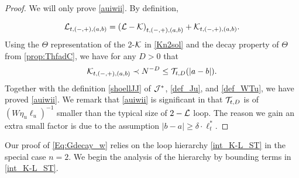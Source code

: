 \documentclass[10pt,reqno]{article}
\theoremstyle{plain} %
\theoremstyle{remark}
\numberwithin{equation}{section}
\begin{document}
\begin{proof} We will only prove \eqref{auiwii}. By definition, 

\[
{\cal L}_{t, (-,+),(a, b)} = \left({\cal L} - \cal K\right)_{t, (-,+),(a, b)} + {\cal K}_{t, (-,+),(a, b)}.
\]
Using the $\Theta$ representation of the 2-\(\cal K\) in \eqref{Kn2sol} and the decay property of \(\Theta\) from \eqref{prop:ThfadC}, we have  for any \(D > 0\) that 
\[
{\cal K}_{t, (-,+),(a, b)} \prec N^{-D} \leq {\cal T}_{t, D}(|a-b|).
\]
Together with the definition \eqref{shoellJJ}  of \(\cal J^*\), \eqref{def_Ju}, and \eqref{def_WTu}, we have proved  \eqref{auiwii}.
We remark that \eqref{auiwii} is significant in that ${\cal T}_{t,D} $ 
is of $\left(W \eta_u \ell_u\right)^{-1}$  smaller than the typical size of $2-{\cal L}$ loop. The reason we gain an extra small factor is due to the assumption  $|b -a|\ge \delta \cdot \ell_t^*$.
\end{proof} 

Our proof of \eqref{Eq:Gdecay_w}   relies on the loop hierarchy \eqref{int_K-L_ST} in the special case $n=2$. 
We begin the analysis of the hierarchy by  bounding  terms in \eqref{int_K-L_ST}.  
\end{document}
